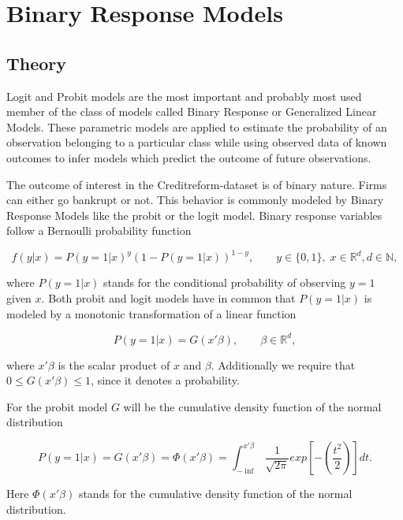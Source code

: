 \documentclass{article}
\begin{document}
\section{Binary Response Models}
\subsection{Theory}

Logit and Probit models are the most important and probably most used member of the class of models called Binary Response or Generalized Linear Models. These parametric models are applied to estimate the probability of an observation belonging to a particular class while using observed data of known outcomes to infer models which predict the outcome of future observations.

The outcome of interest in the Creditreform-dataset is of binary nature. Firms can either go bankrupt or not. This behavior is commonly modeled by Binary Response Models like the probit or the logit model. Binary response variables follow a Bernoulli probability function

\begin{equation}
f(y|x) = P(y=1|x)^y\left(1-P(y=1|x)\right)^{1-y},\qquad y\in \{0,1\},\; x\in \mathbb{R}^d, d \in \mathbb{N},
\end{equation}

where $P(y=1|x)$ stands for the conditional probability of observing $y=1$ given $x$. Both probit and logit models have in common that $P(y=1|x)$ is modeled by a monotonic transformation of a linear function

\begin{equation}
P(y=1|x) = G(x \prime \beta), \qquad \beta \in \mathbb{R}^d,
\end{equation}

where $x \prime \beta$ is the scalar product of $x$ and $\beta$. Additionally we require that $0 \leq G(x \prime \beta) \leq 1$, since it denotes a probability.

For the probit model $G$ will be the cumulative density function of the normal distribution

\begin{equation}
P(y=1|x) = G(x \prime \beta) = \Phi(x \prime \beta) = \int_{-\inf}^{x \prime \beta} \frac{1}{\sqrt{2\pi}}exp\left[-(\frac{t^2}{2})\right]dt.
\end{equation}

Here $\Phi(x \prime \beta)$ stands for the cumulative density function of the normal distribution.
\end{document}
